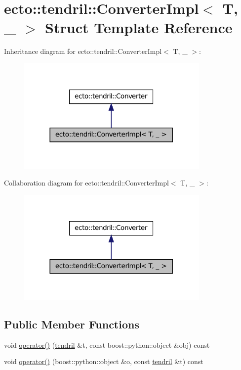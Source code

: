 \hypertarget{structecto_1_1tendril_1_1ConverterImpl}{\section{ecto\-:\-:tendril\-:\-:\-Converter\-Impl$<$ \-T, \-\_\- $>$ \-Struct \-Template \-Reference}
\label{structecto_1_1tendril_1_1ConverterImpl}
}


\-Inheritance diagram for ecto\-:\-:tendril\-:\-:\-Converter\-Impl$<$ \-T, \-\_\- $>$\-:\nopagebreak
\begin{figure}[H]
\begin{center}
\leavevmode
\includegraphics[width=266pt]{structecto_1_1tendril_1_1ConverterImpl__inherit__graph}
\end{center}
\end{figure}


\-Collaboration diagram for ecto\-:\-:tendril\-:\-:\-Converter\-Impl$<$ \-T, \-\_\- $>$\-:\nopagebreak
\begin{figure}[H]
\begin{center}
\leavevmode
\includegraphics[width=266pt]{structecto_1_1tendril_1_1ConverterImpl__coll__graph}
\end{center}
\end{figure}
\subsection*{\-Public \-Member \-Functions}
\begin{DoxyCompactItemize}
\item 
void \hyperlink{structecto_1_1tendril_1_1ConverterImpl_aa03b80197057d2810198e3029a150988}{operator()} (\hyperlink{classecto_1_1tendril}{tendril} \&t, const boost\-::python\-::object \&obj) const 
\item 
void \hyperlink{structecto_1_1tendril_1_1ConverterImpl_a1b9b248c9a7386b8b34a436f0c8453c1}{operator()} (boost\-::python\-::object \&o, const \hyperlink{classecto_1_1tendril}{tendril} \&t) const 
\end{DoxyCompactItemize}

